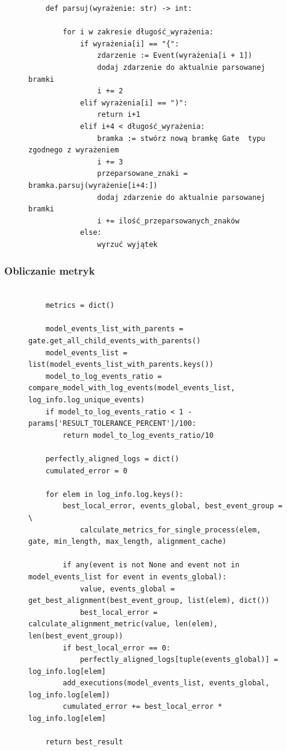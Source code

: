 \begin{figure}[!ht]
\lstset{caption=Parser gramatyki, captionpos=b}
\lstset{label=src:passive, frame=single}
\begin{lstlisting}
    def parsuj(wyrażenie: str) -> int:

        for i w zakresie długość_wyrażenia:
            if wyrażenia[i] == "{":
                zdarzenie := Event(wyrażenia[i + 1])
                dodaj zdarzenie do aktualnie parsowanej bramki 
                i += 2
            elif wyrażenia[i] == ")":
                return i+1
            elif i+4 < długość_wyrażenia:
                bramka := stwórz nową bramkę Gate  typu zgodnego z wyrażeniem 
                i += 3
                przeparsowane_znaki = bramka.parsuj(wyrażenie[i+4:])
                dodaj zdarzenie do aktualnie parsowanej bramki 
                i += ilość_przeparsowanych_znaków
            else:
                wyrzuć wyjątek
\end{lstlisting}
\end{figure}

\subsubsection{Obliczanie metryk}

\begin{figure}[!ht]
\lstset{caption=Obliczanie metryk, captionpos=b}
\lstset{label=src:best_result, frame=single}
\begin{lstlisting}

    metrics = dict()

    model_events_list_with_parents = gate.get_all_child_events_with_parents()
    model_events_list = list(model_events_list_with_parents.keys())
    model_to_log_events_ratio = compare_model_with_log_events(model_events_list, log_info.log_unique_events)
    if model_to_log_events_ratio < 1 - params['RESULT_TOLERANCE_PERCENT']/100:
        return model_to_log_events_ratio/10

    perfectly_aligned_logs = dict()
    cumulated_error = 0

    for elem in log_info.log.keys():
        best_local_error, events_global, best_event_group = \
            calculate_metrics_for_single_process(elem, gate, min_length, max_length, alignment_cache)

        if any(event is not None and event not in model_events_list for event in events_global):
            value, events_global = get_best_alignment(best_event_group, list(elem), dict())
            best_local_error = calculate_alignment_metric(value, len(elem), len(best_event_group))
        if best_local_error == 0:
            perfectly_aligned_logs[tuple(events_global)] = log_info.log[elem]
        add_executions(model_events_list, events_global, log_info.log[elem])
        cumulated_error += best_local_error * log_info.log[elem]

    return best_result
\end{lstlisting}
\end{figure}

